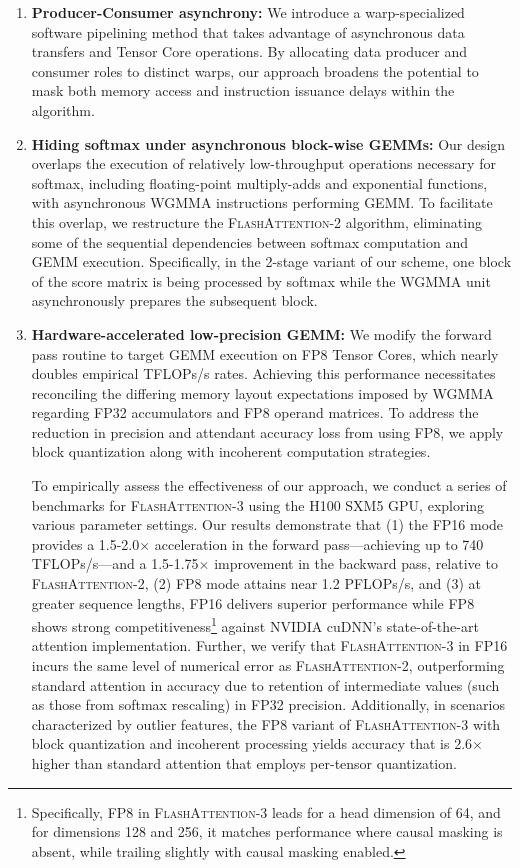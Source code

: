\begin{enumerate}

\item \textbf{Producer-Consumer asynchrony:} We introduce a warp-specialized software pipelining method that takes advantage of asynchronous data transfers and Tensor Core operations. By allocating data producer and consumer roles to distinct warps, our approach broadens the potential to mask both memory access and instruction issuance delays within the algorithm.

\item \textbf{Hiding softmax under asynchronous block-wise GEMMs:} Our design overlaps the execution of relatively low-throughput operations necessary for softmax, including floating-point multiply-adds and exponential functions, with asynchronous WGMMA instructions performing GEMM. To facilitate this overlap, we restructure the \textsc{FlashAttention-2} algorithm, eliminating some of the sequential dependencies between softmax computation and GEMM execution. Specifically, in the 2-stage variant of our scheme, one block of the score matrix is being processed by softmax while the WGMMA unit asynchronously prepares the subsequent block.

\item \textbf{Hardware-accelerated low-precision GEMM:} We modify the forward pass routine to target GEMM execution on FP8 Tensor Cores, which nearly doubles empirical TFLOPs/s rates. Achieving this performance necessitates reconciling the differing memory layout expectations imposed by WGMMA regarding FP32 accumulators and FP8 operand matrices. To address the reduction in precision and attendant accuracy loss from using FP8, we apply block quantization along with incoherent computation strategies.

To empirically assess the effectiveness of our approach, we conduct a series of benchmarks for \textsc{FlashAttention-3} using the H100 SXM5 GPU, exploring various parameter settings. Our results demonstrate that (1) the FP16 mode provides a 1.5-2.0$\times$ acceleration in the forward pass—achieving up to 740 TFLOPs/s—and a 1.5-1.75$\times$ improvement in the backward pass, relative to \textsc{FlashAttention-2}, (2) FP8 mode attains near 1.2 PFLOPs/s, and (3) at greater sequence lengths, FP16 delivers superior performance while FP8 shows strong competitiveness\footnote{Specifically, FP8 in \textsc{FlashAttention-3} leads for a head dimension of 64, and for dimensions 128 and 256, it matches performance where causal masking is absent, while trailing slightly with causal masking enabled.} against NVIDIA cuDNN's state-of-the-art attention implementation. Further, we verify that \textsc{FlashAttention-3} in FP16 incurs the same level of numerical error as \textsc{FlashAttention-2}, outperforming standard attention in accuracy due to retention of intermediate values (such as those from softmax rescaling) in FP32 precision. Additionally, in scenarios characterized by outlier features, the FP8 variant of \textsc{FlashAttention-3} with block quantization and incoherent processing yields accuracy that is 2.6$\times$ higher than standard attention that employs per-tensor quantization.


\end{enumerate}
